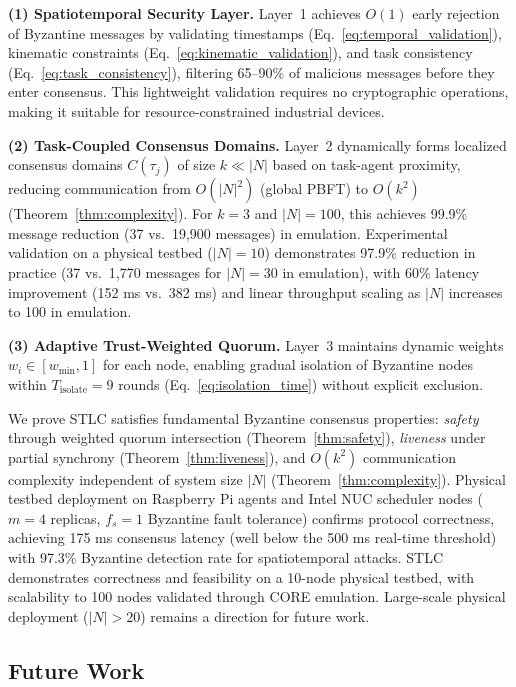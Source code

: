 \documentclass[manuscript,screen,review]{acmart}
\begin{document}
\textbf{(1) Spatiotemporal Security Layer.} Layer~1 achieves $O(1)$ early rejection of Byzantine messages by validating timestamps (Eq.~\ref{eq:temporal_validation}), kinematic constraints (Eq.~\ref{eq:kinematic_validation}), and task consistency (Eq.~\ref{eq:task_consistency}), filtering 65--90\% of malicious messages before they enter consensus. This lightweight validation requires no cryptographic operations, making it suitable for resource-constrained industrial devices.

\textbf{(2) Task-Coupled Consensus Domains.} Layer~2 dynamically forms localized consensus domains $C(\tau_j)$ of size $k \ll |N|$ based on task-agent proximity, reducing communication from $O(|N|^2)$ (global PBFT) to $O(k^2)$ (Theorem~\ref{thm:complexity}). For $k=3$ and $|N|=100$, this achieves 99.9\% message reduction (37 vs.\ 19,900 messages) in emulation. Experimental validation on a physical testbed ($|N|=10$) demonstrates 97.9\% reduction in practice (37 vs.\ 1,770 messages for $|N|=30$ in emulation), with 60\% latency improvement (152 ms vs.\ 382 ms) and linear throughput scaling as $|N|$ increases to 100 in emulation.

\textbf{(3) Adaptive Trust-Weighted Quorum.} Layer~3 maintains dynamic weights $w_i \in [w_{\min}, 1]$ for each node, enabling gradual isolation of Byzantine nodes within $T_{\text{isolate}} = 9$ rounds (Eq.~\ref{eq:isolation_time}) without explicit exclusion.

We prove STLC satisfies fundamental Byzantine consensus properties: \textit{safety} through weighted quorum intersection (Theorem~\ref{thm:safety}), \textit{liveness} under partial synchrony (Theorem~\ref{thm:liveness}), and $O(k^2)$ communication complexity independent of system size $|N|$ (Theorem~\ref{thm:complexity}). Physical testbed deployment on Raspberry Pi agents and Intel NUC scheduler nodes ($m = 4$ replicas, $f_s = 1$ Byzantine fault tolerance) confirms protocol correctness, achieving 175 ms consensus latency (well below the 500 ms real-time threshold) with 97.3\% Byzantine detection rate for spatiotemporal attacks. STLC demonstrates correctness and feasibility on a 10-node physical testbed, with scalability to 100 nodes validated through CORE emulation. Large-scale physical deployment ($|N| > 20$) remains a direction for future work.

\subsection{Future Work}
\label{sec:future}
\end{document}
